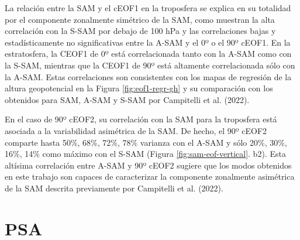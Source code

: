 \documentclass[12pt,oneside]{reedthesis}
\begin{document}
La relación entre la SAM y el cEOF1 en la troposfera se explica en su totalidad por el componente zonalmente simétrico de la SAM, como muestran la alta correlación con la S-SAM por debajo de 100 hPa y las correlaciones bajas y estadísticamente no significativas entre la A-SAM y el 0º o el 90º cEOF1.
En la estratosfera, la CEOF1 de 0º está correlacionada tanto con la A-SAM como con la S-SAM, mientras que la CEOF1 de 90º está altamente correlacionada sólo con la A-SAM.
Estas correlaciones son consistentes con los mapas de regresión de la altura geopotencial en la Figura \ref{fig:eof1-regr-gh} y su comparación con los obtenidos para SAM, A-SAM y S-SAM por Campitelli et al. (2022).

En el caso de 90º cEOF2, su correlación con la SAM para la troposfera está asociada a la variabilidad asimétrica de la SAM.
De hecho, el 90º cEOF2 comparte hasta 50\%, 68\%, 72\%, 78\% varianza con el A-SAM y sólo 20\%, 30\%, 16\%, 14\% como máximo con el S-SAM (Figura \ref{fig:sam-eof-vertical}.
b2).
Esta altísima correlación entre A-SAM y 90º cEOF2 sugiere que los modos obtenidos en este trabajo son capaces de caracterizar la componente zonalmente asimétrica de la SAM descrita previamente por Campitelli et al. (2022).

\hypertarget{psa}{%
\section{PSA}\label{psa}}
\end{document}

